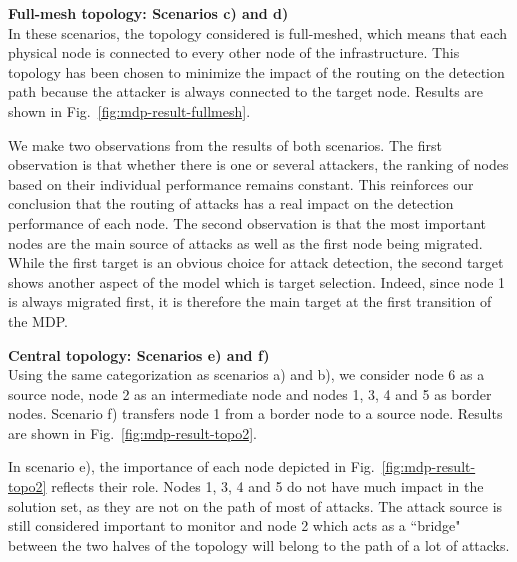 \textbf{Full-mesh topology: Scenarios c) and d) \\}
In these scenarios, the topology considered is full-meshed, which means that each physical node is connected to every other node of the infrastructure. This topology has been chosen to minimize the impact of the routing on the detection path because the attacker is always connected to the target node.
Results are shown in Fig.~\ref{fig:mdp-result-fullmesh}.

We make two observations from the results of both scenarios.
The first observation is that whether there is one or several attackers, the ranking of nodes based on their individual performance remains constant. This reinforces our conclusion that the routing of attacks has a real impact on the detection performance of each node.
The second observation is that the most important nodes are the main source of attacks as well as the first node being migrated. While the first target is an obvious choice for attack detection, the second target shows another aspect of the model which is target selection. Indeed, since node 1 is always migrated first, it is therefore the main target at the first transition of the MDP.



\textbf{Central topology: Scenarios e) and f) \\}
Using the same categorization as scenarios a) and b), we consider node 6 as a source node, node 2 as an intermediate node and nodes 1, 3, 4 and 5 as border nodes. Scenario f) transfers node 1 from a border node to a source node. Results are shown in Fig.~\ref{fig:mdp-result-topo2}.

In scenario e), the importance of each node depicted in Fig.~\ref{fig:mdp-result-topo2} reflects their role. Nodes 1, 3, 4 and 5 do not have much impact in the solution set, as they are not on the path of most of attacks. The attack source is still considered important to monitor and node 2 which acts as a ``bridge" between the two halves of the topology will belong to the path of a lot of attacks.

